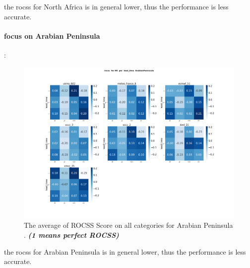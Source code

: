 the rocss for North Africa is in general lower, thus the performance is less accurate.

\paragraph{focus on Arabian Peninsula}:
\begin{figure}[H]
    \centering
    \includegraphics[scale=0.25]{plots/prob/rocss/rocss_RR_lead_time_ArabianPeninsula.png}
    \caption{The average of  ROCSS Score on all categories for Arabian Peninsula . \textbf{\textit{(1 means perfect ROCSS)}}}
\end{figure}


the rocss for Arabian Peninsula is in general lower, thus the performance is less accurate.

